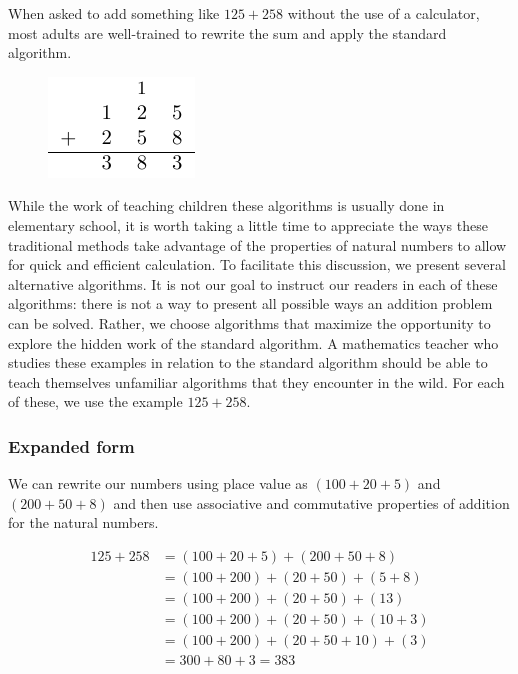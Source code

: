 \documentclass[
]{book}
\theoremstyle{definition}
\theoremstyle{definition}
\theoremstyle{definition}
\theoremstyle{definition}
\theoremstyle{remark}
\begin{document}
When asked to add something like \(125+258\) without the use of a calculator, most adults are well-trained to rewrite the sum and apply the standard algorithm.

\begin{figure}

{\centering \includegraphics[width=0.2\linewidth]{tikz/addition-model-algorithm} 

}

\end{figure}

While the work of teaching children these algorithms is usually done in elementary school, it is worth taking a little time to appreciate the ways these traditional methods take advantage of the properties of natural numbers to allow for quick and efficient calculation. To facilitate this discussion, we present several alternative algorithms. It is not our goal to instruct our readers in each of these algorithms: there is not a way to present all possible ways an addition problem can be solved. Rather, we choose algorithms that maximize the opportunity to explore the hidden work of the standard algorithm. A mathematics teacher who studies these examples in relation to the standard algorithm should be able to teach themselves unfamiliar algorithms that they encounter in the wild. For each of these, we use the example \(125+258\).

\hypertarget{expanded-form}{%
\subsubsection*{Expanded form}\label{expanded-form}}

We can rewrite our numbers using place value as \((100+20+5)\) and \((200+50+8)\) and then use associative and commutative properties of addition for the natural numbers.

\begin{align*}
    125+258 &= (100+20+5) + (200+50+8) \\
    &= (100+200) + (20+50) + (5+8)  \\
    &= (100+200) + (20+50) + (13) \\
    &= (100+200) + (20+50) + (10 + 3) \\
    &= (100+200) + (20+50+10) + (3) \\
    &= 300 + 80 + 3 =383 \\
\end{align*}
\end{document}
